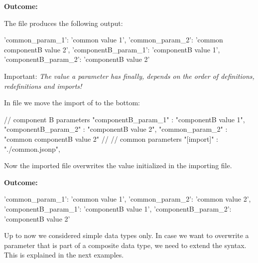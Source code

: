 \textbf{Outcome:}

\vspace{2ex}

The file  produces the following output:

\begin{pythonlog}
{'common_param_1': 'common value 1',
 'common_param_2': 'common componentB value 2',
 'componentB_param_1': 'componentB value 1',
 'componentB_param_2': 'componentB value 2'}
\end{pythonlog}

\vspace{2ex}

Important: \textit{The value a parameter has finally, depends on the order of definitions, redefinitions and imports!}

\vspace{2ex}

In file  we move the import of  to the bottom:

\begin{pythoncode}[linebackgroundcolor=\hlcode{8}]
{
   // component B parameters
   "componentB_param_1" : "componentB value 1",
   "componentB_param_2" : "componentB value 2",
   "common_param_2" : "common componentB value 2"
   //
   // common parameters
   "[import]" : "./common.jsonp",
}
\end{pythoncode}

Now the imported file overwrites the value initialized in the importing file.

\vspace{2ex}

\textbf{Outcome:}

\vspace{2ex}

\begin{pythonlog}
{'common_param_1': 'common value 1',
 'common_param_2': 'common value 2',
 'componentB_param_1': 'componentB value 1',
 'componentB_param_2': 'componentB value 2'}
\end{pythonlog}

\vspace{2ex}

Up to now we considered simple data types only. In case we want to overwrite a parameter that is part of a composite data type, we need to extend the syntax.
This is explained in the next examples.

\vspace{2ex}

